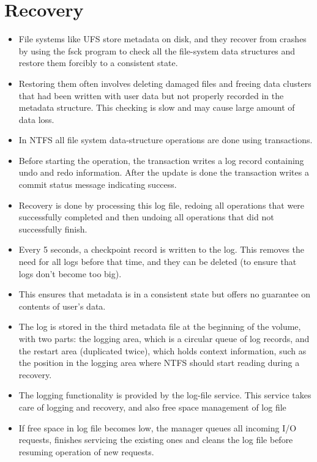 \documentclass{article}
\theoremstyle{plain}
\theoremstyle{definition}
\begin{document}
\section{Recovery}
\begin{itemize}
    \item File systems like UFS store metadata on disk, and they recover from crashes by using the fsck program to check all the file-system data structures and restore them forcibly to a consistent state. 
    
    \item Restoring them often involves deleting damaged files and freeing data clusters that had been written with user data but not properly recorded in the metadata structure. This checking is slow and may cause large amount of data loss. 
    
    \item In NTFS all file system data-structure operations are done using transactions. 
    
    \item Before starting the operation, the transaction writes a log record containing undo and redo information. After the update is done the transaction writes a commit status message indicating success. 
    
    \item Recovery is done by processing this log file, redoing all operations that were successfully completed and then undoing all operations that did not successfully finish. 
    
    \item Every 5 seconds, a checkpoint record is written to the log. This removes the need for all logs before that time, and they can be deleted (to ensure that logs don't become too big). 
    \item This ensures that metadata is in a consistent state but offers no guarantee on contents of user's data. 
    
    \item The log is stored in the third metadata file at the beginning of the volume, with two parts: the logging area, which is a circular queue of log records, and
    the restart area (duplicated twice), which holds context information, such as the position in the logging area where NTFS should start reading during a recovery.
    
    \item The logging functionality is provided by the log-file service. This service takes care of logging and recovery, and also free space management of log file
    
    \item If free space in log file becomes low, the manager queues all incoming I/O requests, finishes servicing the existing ones and cleans the log file before resuming operation of new requests. 
\end{itemize}
\end{document}
